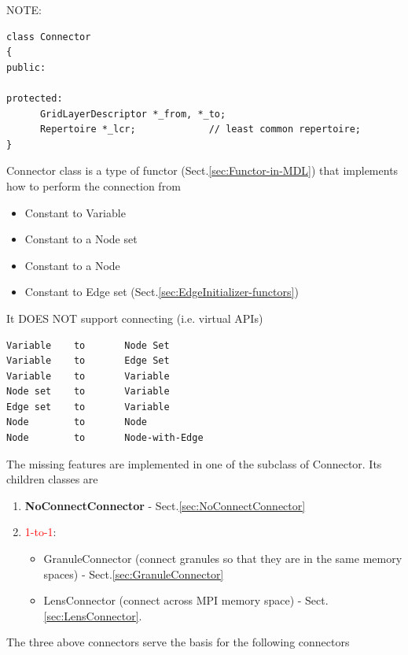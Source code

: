 NOTE:
\begin{verbatim}
class Connector
{
public:

protected:
      GridLayerDescriptor *_from, *_to;
      Repertoire *_lcr;             // least common repertoire;
}
\end{verbatim}

Connector class is a type of functor (Sect.\ref{sec:Functor-in-MDL})
that implements how to perform the connection from
\begin{itemize}
  \item Constant to Variable
  
  \item Constant to a Node set
  
  \item Constant to a Node 
  
  \item Constant to Edge set (Sect.\ref{sec:EdgeInitializer-functors})
  
\end{itemize}

It DOES NOT support connecting (i.e. virtual APIs)
\begin{verbatim}
Variable    to       Node Set
Variable    to       Edge Set
Variable    to       Variable
Node set    to       Variable
Edge set    to       Variable
Node        to       Node
Node        to       Node-with-Edge
\end{verbatim}

The missing features are implemented in one of the subclass of Connector. Its
children classes are
\begin{enumerate}
  \item {\bf NoConnectConnector} - Sect.\ref{sec:NoConnectConnector}
  
    \item \textcolor{red}{1-to-1}:

  \begin{itemize}
  \item GranuleConnector (connect granules so that they are in the same memory
  spaces) - Sect.\ref{sec:GranuleConnector}
  
  \item LensConnector (connect across MPI memory space) -
  Sect.\ref{sec:LensConnector}.

  \end{itemize}
\end{enumerate}
The three above connectors serve the basis for the following connectors

